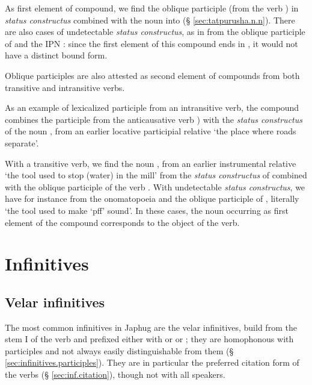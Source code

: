As first element of compound, we find the oblique participle  (from the verb ) in \textit{status constructus} combined with the noun  into 
 (§ \ref{sec:tatpurusha.n.n}). There are also cases of undetectable \textit{status constructus}, as in  from the oblique participle of  and the IPN : since the first element of this compound  ends in , it would not have a distinct bound form.

Oblique participles are also attested as second element of compounds from both transitive and intransitive verbs. 

As an example of lexicalized participle from an intransitive verb, the compound  combines the participle  from the anticausative verb ) with the \textit{status constructus} of the noun , from an earlier locative participial relative  `the place where roads separate'. 

With a transitive verb, we find the noun , from an earlier instrumental relative  `the tool used to stop (water) in the mill' from the \textit{status constructus}  of  combined with the oblique participle  of the verb . With undetectable \textit{status constructus}, we have for instance  from the  onomatopoeia  and the oblique participle of , literally `the tool used to make `pff' sound'. In these cases, the noun occurring as first element of the compound corresponds to the object of the verb.


\section{Infinitives}

 
\subsection{Velar infinitives} \label{sec:velar.inf}
The most common infinitives in Japhug are the velar infinitives, build from the stem I of the verb and prefixed either with  or or ; they are homophonous with participles and not always easily distinguishable from them (§ \ref{sec:infinitives.participles}). They are in particular the preferred citation form of the verbs (§ \ref{sec:inf.citation}), though not with all speakers.
 
